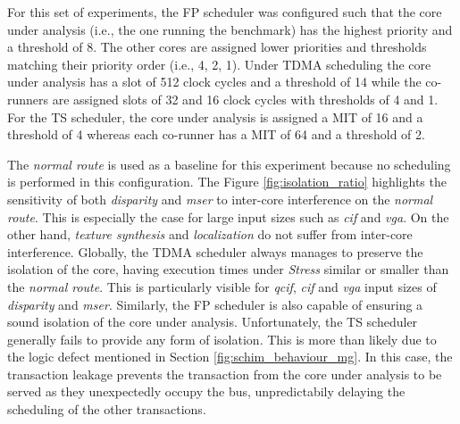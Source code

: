 For this set of experiments, the FP scheduler was configured such that the core under
analysis (i.e., the one running the benchmark) has the highest priority
and a threshold of 8. The other cores are assigned lower priorities and
thresholds matching their priority order (i.e., 4, 2, 1). Under TDMA scheduling the core under analysis has a slot of 512 clock cycles and a threshold of 14 while the co-runners are assigned slots of 32 and 16 clock cycles with thresholds of 4 and 1. For the TS scheduler, the core under analysis is assigned a MIT of 16 and a threshold of 4 whereas each co-runner has a MIT of 64 and a threshold of 2.

The \emph{normal route} is used as a baseline for this experiment
because no scheduling is performed in this configuration.
The Figure \ref{fig:isolation_ratio} highlights the sensitivity of both
\emph{disparity} and \emph{mser} to inter-core interference on the
\emph{normal route}. This is especially the case for large input sizes
such as \emph{cif} and \emph{vga}. On the other hand, \emph{texture
synthesis} and \emph{localization} do not suffer from inter-core
interference.
Globally, the TDMA scheduler always manages to preserve the isolation of
the core, having execution times under \emph{Stress} similar or smaller than the \emph{normal route}. This is particularly visible for \emph{qcif}, \emph{cif} and \emph{vga} input sizes of \emph{disparity} and \emph{mser}.
Similarly, the FP scheduler is also capable of ensuring a sound
isolation of the core under analysis.
Unfortunately, the TS scheduler generally fails to provide any form of
isolation. This is more than likely due to the logic defect mentioned in
Section \ref{fig:schim_behaviour_mg}. In this case, the transaction leakage
prevents the transaction from the core under analysis to be served as they
unexpectedly occupy the bus, unpredictabily delaying the scheduling of the other transactions.
